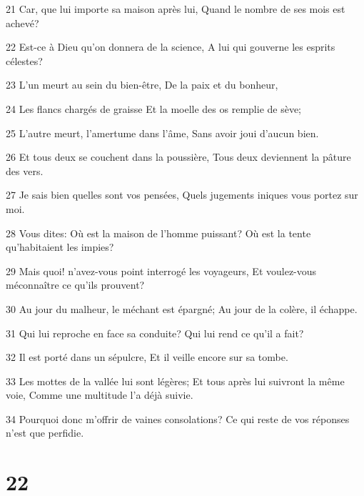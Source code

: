 \par 21 Car, que lui importe sa maison après lui, Quand le nombre de ses mois est achevé?
\par 22 Est-ce à Dieu qu'on donnera de la science, A lui qui gouverne les esprits célestes?
\par 23 L'un meurt au sein du bien-être, De la paix et du bonheur,
\par 24 Les flancs chargés de graisse Et la moelle des os remplie de sève;
\par 25 L'autre meurt, l'amertume dans l'âme, Sans avoir joui d'aucun bien.
\par 26 Et tous deux se couchent dans la poussière, Tous deux deviennent la pâture des vers.
\par 27 Je sais bien quelles sont vos pensées, Quels jugements iniques vous portez sur moi.
\par 28 Vous dites: Où est la maison de l'homme puissant? Où est la tente qu'habitaient les impies?
\par 29 Mais quoi! n'avez-vous point interrogé les voyageurs, Et voulez-vous méconnaître ce qu'ils prouvent?
\par 30 Au jour du malheur, le méchant est épargné; Au jour de la colère, il échappe.
\par 31 Qui lui reproche en face sa conduite? Qui lui rend ce qu'il a fait?
\par 32 Il est porté dans un sépulcre, Et il veille encore sur sa tombe.
\par 33 Les mottes de la vallée lui sont légères; Et tous après lui suivront la même voie, Comme une multitude l'a déjà suivie.
\par 34 Pourquoi donc m'offrir de vaines consolations? Ce qui reste de vos réponses n'est que perfidie.

\chapter{22}

